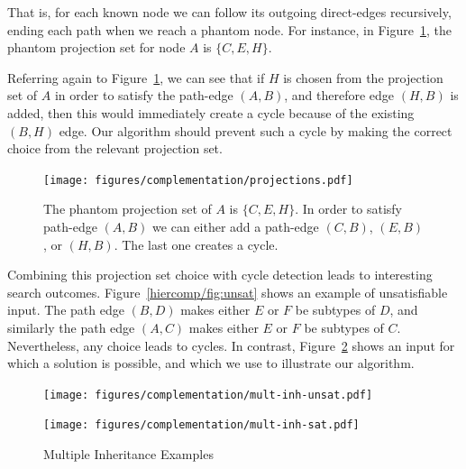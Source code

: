 That is, for each known node we can follow its outgoing direct-edges
recursively, ending each path when we reach a phantom node. For
instance, in Figure~\ref{hiercomp/fig:proj}, the phantom projection set for
node $A$ is $\{C,E,H\}$.


Referring again to Figure~\ref{hiercomp/fig:proj}, we can see that if $H$ is
chosen from the projection set of $A$ in order to satisfy the
path-edge $(A,B)$, and therefore edge $(H,B)$ is added, then this
would immediately create a cycle because of the existing $(B,H)$
edge. Our algorithm should prevent such a cycle by making the correct
choice from the relevant projection set.

\begin{figure}
  \centering
  \texttt{[image: figures/complementation/projections.pdf]}
  \caption[Phantom Projection Set]{%
    The phantom projection set of $A$ is $\{C,E,H\}$. In order to
    satisfy path-edge $(A,B)$ we can either add a path-edge $(C,B)$,
    $(E,B)$, or $(H,B)$. The last one creates a cycle.
  }
  \label{hiercomp/fig:proj}
\end{figure}


Combining this projection set choice with cycle detection leads to
interesting search outcomes. Figure~\ref{hiercomp/fig:unsat} shows an example
of unsatisfiable input. The path edge $(B,D)$ makes either $E$ or $F$
be subtypes of $D$, and similarly the path edge $(A,C)$ makes either
$E$ or $F$ be subtypes of $C$. Nevertheless, any choice leads to
cycles. In contrast, Figure~\ref{hiercomp/fig:multipleHard} shows an input for
which a solution is possible, and which we use to illustrate our
algorithm.

\begin{figure}
  \begin{minipage}[b]{.5\linewidth}
    \centering
    \texttt{[image: figures/complementation/mult-inh-unsat.pdf]}
    \label{hiercomp/fig:unsat}
  \end{minipage}
  \begin{minipage}[b]{.5\linewidth}
    \centering
    \texttt{[image: figures/complementation/mult-inh-sat.pdf]}
    \label{hiercomp/fig:multipleHard}
  \end{minipage}
  \caption{Multiple Inheritance Examples}
\end{figure}

